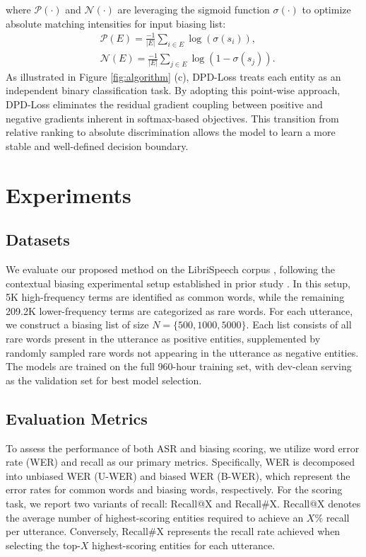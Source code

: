 \documentclass[cameraready]{Interspeech}
\begin{document}
%
where $\mathcal{P}(\cdot)$ and $\mathcal{N}(\cdot)$ are leveraging the sigmoid function $\sigma(\cdot)$ to optimize absolute matching intensities for input biasing list:
%
\begin{align}
  &\mathcal{P}(E)=\frac{-1}{|E|}\sum_{i \in E}\log{(\sigma(s_i))}, \\
  &\mathcal{N}(E)=\frac{-1}{|E|}\sum_{j \in E}\log{(1-\sigma(s_j))}.
\end{align}
%
As illustrated in Figure \ref{fig:algorithm} (c), DPD-Loss treats each entity as an independent binary classification task.
%
By adopting this point-wise approach, DPD-Loss eliminates the residual gradient coupling between positive and negative gradients inherent in softmax-based objectives.
%
This transition from relative ranking to absolute discrimination allows the model to learn a more stable and well-defined decision boundary.



\section{Experiments}
\subsection{Datasets}
We evaluate our proposed method on the LibriSpeech corpus \cite{librispeech2015}, following the contextual biasing experimental setup established in prior study \cite{le2021contextualized}.
%
In this setup, 5K high-frequency terms are identified as common words, while the remaining 209.2K lower-frequency terms are categorized as rare words.
%
For each utterance, we construct a biasing list of size $N=\{500, 1000, 5000\}$.
%
Each list consists of all rare words present in the utterance as positive entities, supplemented by randomly sampled rare words not appearing in the utterance as negative entities.
%
The models are trained on the full 960-hour training set, with dev-clean serving as the validation set for best model selection.


\subsection{Evaluation Metrics}
To assess the performance of both ASR and biasing scoring, we utilize word error rate (WER) and recall as our primary metrics.
%
Specifically, WER is decomposed into unbiased WER (U-WER) and biased WER (B-WER), which represent the error rates for common words and biasing words, respectively.
%
For the scoring task, we report two variants of recall: Recall@X and Recall\#X.
%
Recall@X denotes the average number of highest-scoring entities required to achieve an $X\%$ recall per utterance.
%
Conversely, Recall\#X represents the recall rate achieved when selecting the top-$X$ highest-scoring entities for each utterance.
\end{document}
